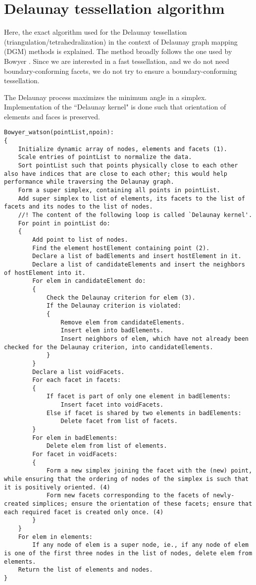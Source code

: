 \chapter{Delaunay tessellation algorithm}

Here, the exact algorithm used for the Delaunay tessellation (triangulation/tetrahedralization) in the context of Delaunay graph mapping (DGM) methods is explained. The method broadly follows the one used by Bowyer \cite{bowyer}. Since we are interested in a fast tessellation, and we do not need boundary-conforming facets, we do not try to ensure a boundary-conforming tessellation.

The Delaunay process maximizes the minimum angle in a simplex. Implementation of the ``Delaunay kernel" is done such that orientation of elements and faces is preserved.

\lstset{breaklines=true, tabsize=2}

\begin{lstlisting}
Bowyer_watson(pointList,npoin):
{
	Initialize dynamic array of nodes, elements and facets (1).
	Scale entries of pointList to normalize the data.
	Sort pointList such that points physically close to each other also have indices that are close to each other; this would help performance while traversing the Delaunay graph.
	Form a super simplex, containing all points in pointList.
	Add super simplex to list of elements, its facets to the list of facets and its nodes to the list of nodes.
	//! The content of the following loop is called `Delaunay kernel'.
	For point in pointList do:
	{
		Add point to list of nodes.
		Find the element hostElement containing point (2).
		Declare a list of badElements and insert hostElement in it.
		Declare a list of candidateElements and insert the neighbors of hostElement into it.
		For elem in candidateElement do:
		{
			Check the Delaunay criterion for elem (3).
			If the Delaunay criterion is violated:
			{
				Remove elem from candidateElements.
				Insert elem into badElements.
				Insert neighbors of elem, which have not already been checked for the Delaunay criterion, into candidateElements.
			}
		}
		Declare a list voidFacets.
		For each facet in facets:
		{
			If facet is part of only one element in badElements:
				Insert facet into voidFacets.
			Else if facet is shared by two elements in badElements:
				Delete facet from list of facets.
		}
		For elem in badElements:
			Delete elem from list of elements.
		For facet in voidFacets:
		{
			Form a new simplex joining the facet with the (new) point, while ensuring that the ordering of nodes of the simplex is such that it is positively oriented. (4)
			Form new facets corresponding to the facets of newly-created simplices; ensure the orientation of these facets; ensure that each required facet is created only once. (4)
		}
	}
	For elem in elements:
		If any node of elem is a super node, ie., if any node of elem is one of the first three nodes in the list of nodes, delete elem from elements.
	Return the list of elements and nodes.
}
\end{lstlisting}

